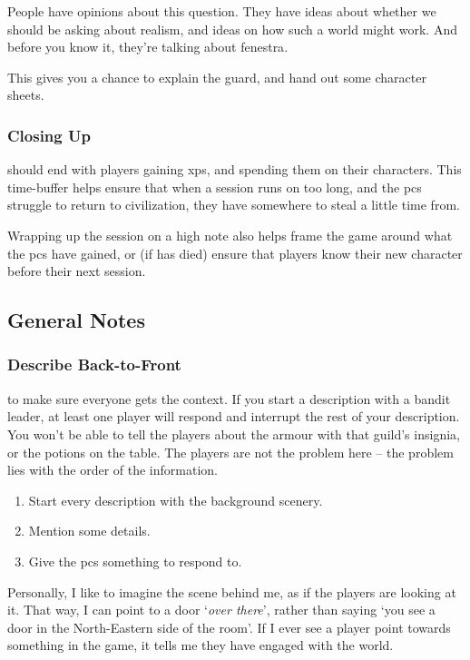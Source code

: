 \begin{multicols}{2}
People have opinions about this question.
They have ideas about whether we should be asking about realism, and ideas on how such a world might work.
And before you know it, they're talking about \gls{fenestra}.

This gives you a chance to explain the \gls{guard}, and hand out some character sheets.

\subsubsection{Closing Up}
should end with players gaining \glspl{xp}, and spending them on their characters.
This time-buffer helps ensure that when a session runs on too long, and the \glspl{pc} struggle to return to civilization, they have somewhere to steal a little time from.

Wrapping up the session on a high note also helps frame the game around what the \glspl{pc} have gained, or (if  has died) ensure that players know their new character before their next session.

\subsection{General Notes}

\subsubsection{Describe Back-to-Front}
to make sure everyone gets the context.
If you start a description with a bandit leader, at least one player will respond and interrupt the rest of your description.
You won't be able to tell the players about the armour with that guild's insignia, or the potions on the table.
The players are not the problem here -- the problem lies with the order of the information.

\begin{enumerate}
  \item
  Start every description with the background scenery.
  \item
  Mention some details.
  \item
  Give the \glspl{pc} something to respond to.
\end{enumerate}

Personally, I like to imagine the scene behind me, as if the players are looking at it.
That way, I can point to a door `\emph{over there}', rather than saying `you see a door in the North-Eastern side of the room'.
If I ever see a player point towards something in the game, it tells me they have engaged with the world.


\end{multicols}
